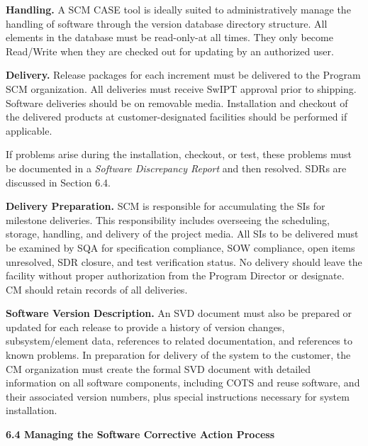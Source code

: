 \documentclass[8pt,twocolumn]{amsart}
\theoremstyle{plain}
\begin{document}
{\bf Handling.} A SCM CASE tool is ideally suited to administratively manage the handling of software through the version database directory structure. All elements in the database must be read-only-at all times. They only become Read/Write when they are checked out for updating by an authorized user. 

{\bf Delivery.} Release packages for each increment must be delivered to the Program SCM organization. All deliveries must receive SwIPT approval prior to shipping. Software deliveries should be on removable media. Installation and checkout of the delivered products at customer-designated facilities should be performed if applicable.

If problems arise during the installation, checkout, or test, these problems must be documented in a {\em Software Discrepancy Report} and then resolved. SDRs are discussed in Section 6.4. 

{\bf Delivery Preparation.} SCM is responsible for accumulating the SIs for milestone deliveries. This responsibility includes overseeing the scheduling, storage, handling, and delivery of the project media. All SIs to be delivered must be examined by SQA for specification compliance, SOW compliance, open items unresolved, SDR closure, and test verification status. No delivery should leave the facility without proper authorization from the Program Director or designate. CM should retain records of all deliveries.
 
{\bf Software Version Description.} An SVD document must also be prepared or updated for each release to provide a history of version changes, subsystem/element data, references to related documentation, and references to known problems. In preparation for delivery of the system to the customer, the CM organization must create the formal SVD document with detailed information on all software components, including COTS and reuse software, and their associated version numbers, plus special instructions necessary for system installation.

{\bf 6.4 Managing the Software Corrective Action Process}
\end{document}
